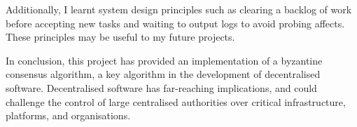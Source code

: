 Additionally, I learnt system design principles such as clearing a backlog of work before accepting new tasks and waiting to output logs to avoid probing affects. These principles may be useful to my future projects.

In conclusion, this project has provided an implementation of a byzantine consensus algorithm, a key algorithm in the development of decentralised software. Decentralised software has far-reaching implications, and could challenge the control of large centralised authorities over critical infrastructure, platforms, and organisations.